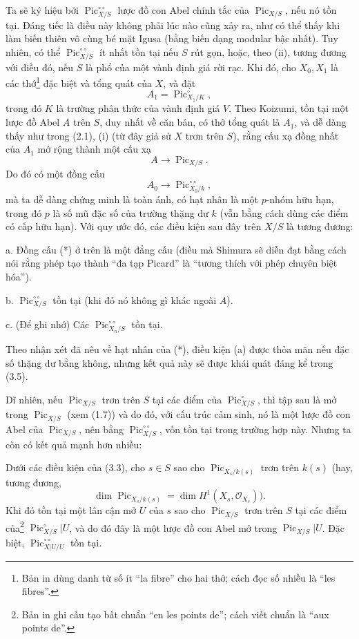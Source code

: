  Ta sẽ ký hiệu bởi
$\operatorname{Pic}_{X/S}^{\circ\circ}$ lược đồ con Abel chính tắc của
$\operatorname{Pic}_{X/S}$, nếu nó tồn tại. Đáng tiếc là điều này không phải
lúc nào cũng xảy ra, như có thể thấy khi làm biến thiên vô cùng bé mặt Igusa
(bằng biến dạng modular bậc nhất). Tuy nhiên, có thể
$\operatorname{Pic}_{X/S}^{\circ\circ}$ ít nhất tồn tại nếu $S$ rút gọn,
hoặc, theo (ii), tương đương với điều đó, nếu $S$ là phổ của một vành định giá
rời rạc. Khi đó, cho $X_0,X_1$ là các thớ\footnote{Bản in dùng danh từ số ít
``la fibre'' cho hai thớ; cách đọc số nhiều là ``les
fibres''.} đặc biệt và tổng quát của $X$, và đặt
\[
A_1=\operatorname{Pic}_{X_1/K}^\circ,
\]
trong đó $K$ là trường phân thức của vành định giá $V$. Theo Koizumi, tồn tại
một lược đồ Abel $A$ trên $S$, duy nhất về căn bản, có thớ tổng quát là $A_1$,
và dễ dàng thấy như trong (2.1), (i) (từ đây giả sử $X$ trơn trên $S$), rằng
cấu xạ đồng nhất của $A_1$ mở rộng thành một cấu xạ
\[
A\longrightarrow\operatorname{Pic}_{X/S}.
\]
Do đó có một đồng cấu
\[
\tag{*}A_0\longrightarrow\operatorname{Pic}_{X_0/k}^{\circ\circ},
\]
mà ta dễ dàng chứng minh là toàn ánh, có hạt nhân là một $p$-nhóm hữu hạn,
trong đó $p$ là số mũ đặc số của trường thặng dư $k$
(vẫn bằng cách dùng các điểm có cấp hữu hạn). Với quy ước đó, các điều kiện
sau đây trên $X/S$ là tương đương:

\medskip
\noindent a. Đồng cấu (*) ở trên là một đẳng cấu (điều mà Shimura sẽ diễn đạt
bằng cách nói rằng phép tạo thành ``đa tạp Picard'' là ``tương thích với phép
chuyên biệt hóa'').

\noindent b. $\operatorname{Pic}_{X/S}^{\circ\circ}$ tồn tại (khi đó nó
không gì khác ngoài $A$).

\noindent c. (Để ghi nhớ) Các
$\operatorname{Pic}_{X_n/S}^{\circ\circ}$ tồn tại.

Theo nhận xét đã nêu về hạt nhân của (*), điều kiện (a) được thỏa mãn nếu đặc
số thặng dư bằng không, nhưng kết quả này sẽ được khái quát đáng kể trong
(3.5).

Dĩ nhiên, nếu $\operatorname{Pic}_{X/S}$ trơn trên $S$ tại các điểm của
$\operatorname{Pic}_{X/S}^\circ$, thì tập sau là mở trong
$\operatorname{Pic}_{X/S}$ (xem (1.7)) và do đó, với cấu trúc cảm sinh, nó là
một lược đồ con Abel của $\operatorname{Pic}_{X/S}$, nên bằng
$\operatorname{Pic}_{X/S}^{\circ\circ}$, vốn tồn tại trong trường hợp này.
Nhưng ta còn có kết quả mạnh hơn nhiều:

 Dưới các điều kiện của (3.3), cho $s\in S$ sao cho
$\operatorname{Pic}_{X_s/k(s)}$ trơn trên $k(s)$ (hay, tương đương,
\[
\dim\operatorname{Pic}_{X_s/k(s)}=\dim H^1(X_s,\mathcal O_{X_s})).
\]
Khi đó tồn tại một lân cận mở $U$ của $s$ sao cho
$\operatorname{Pic}_{X/S}$ trơn trên $S$ tại các điểm của\footnote{Bản in ghi
cấu tạo bất chuẩn ``en les points de''; cách viết chuẩn là ``aux
points de''.} $\operatorname{Pic}_{X/S}^\circ|U$, và do đó đây là một lược
đồ con Abel mở trong $\operatorname{Pic}_{X/S}|U$. Đặc biệt,
$\operatorname{Pic}_{X|U/U}^{\circ\circ}$ tồn tại.

